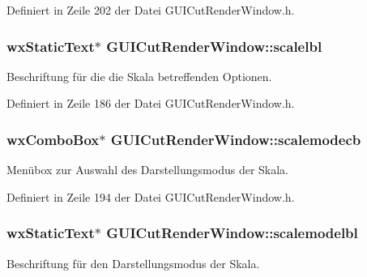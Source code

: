 Definiert in Zeile 202 der Datei G\-U\-I\-Cut\-Render\-Window.\-h.

\hypertarget{classGUICutRenderWindow_a3c1e80a372d6eaacd4f6ca71a788c9fd}{
\subsubsection[{scalelbl}]{\setlength{\rightskip}{0pt plus 5cm}wx\-Static\-Text$\ast$ G\-U\-I\-Cut\-Render\-Window\-::scalelbl\hspace{0.3cm}{\ttfamily [private]}}}\label{classGUICutRenderWindow_a3c1e80a372d6eaacd4f6ca71a788c9fd}
Beschriftung für die die Skala betreffenden Optionen. 

Definiert in Zeile 186 der Datei G\-U\-I\-Cut\-Render\-Window.\-h.

\hypertarget{classGUICutRenderWindow_af535e1e80e14178ff5c05707261a183d}{
\subsubsection[{scalemodecb}]{\setlength{\rightskip}{0pt plus 5cm}wx\-Combo\-Box$\ast$ G\-U\-I\-Cut\-Render\-Window\-::scalemodecb\hspace{0.3cm}{\ttfamily [private]}}}\label{classGUICutRenderWindow_af535e1e80e14178ff5c05707261a183d}
Menübox zur Auswahl des Darstellungsmodus der Skala. 

Definiert in Zeile 194 der Datei G\-U\-I\-Cut\-Render\-Window.\-h.

\hypertarget{classGUICutRenderWindow_a2a3f0b64122aff2f336f94fb72b3b8ac}{
\subsubsection[{scalemodelbl}]{\setlength{\rightskip}{0pt plus 5cm}wx\-Static\-Text$\ast$ G\-U\-I\-Cut\-Render\-Window\-::scalemodelbl\hspace{0.3cm}{\ttfamily [private]}}}\label{classGUICutRenderWindow_a2a3f0b64122aff2f336f94fb72b3b8ac}
Beschriftung für den Darstellungsmodus der Skala. 

